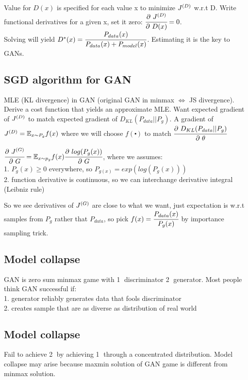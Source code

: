 \documentclass[12pt,a4paper]{article}
\begin{document}
Value for $D(x)$ is specified for each value x to minimize $J^{(D)}$ w.r.t D.
Write functional derivatives for a given x, set it zero: 
$\cfrac{\partial\ J^{(D)}}{\partial\ D(x)}=0$. \\
Solving will yield $D^*(x)=\cfrac{P_{data}(x)}{P_{data}(x)+P_{model}(x)}$. Estimating it is the key to GANs. 


\subsection{SGD algorithm for GAN}
MLE (KL divergence) in GAN (original GAN in minmax $\Leftrightarrow$ JS divergence). 
Derive a cost function that yields an approximate MLE. Want expected gradient of $J^{(D)}$ to match expected gradient of $D_{KL}(P_{data}||P_g)$. A gradient of $J^{(D)}=\mathbb{E}_{x\sim P_g} f(x)$ where we will choose $f(\centerdot)$ to match $\cfrac{\partial\ D_{KL}(P_{data}||P_g)}{\partial\ \theta}$ 

$\cfrac{\partial\ J^{(G)}}{\partial\ G}=\mathbb{E}_{x\sim p_g}f(x)\cfrac{\partial\ log(P_g(x))}{\partial\ G}$, where we assumes:\\
1. $P_g(x)\geq 0$ everywhere, so $P_{g(x)}=exp(log(P_g(x)))$\\
2. function derivative is continuous, so we can interchange derivative integral (Leibniz rule)

So we see derivatives of $J^{(G)}$ are close to what we want, just expectation is w.r.t samples from $P_g$ rather that $P_{data}$, so pick $f(x)=\cfrac{P_{data}(x)}{P_g(x)}$ by importance sampling trick.


\subsection{Model collapse}
GAN is zero sum minmax game with \textcircled{1} discriminator \textcircled{2} generator. Most people think GAN successful if:\\
1. generator reliably generates data that fools discriminator\\
2. creates sample that are as diverse as distribution of real world

\subsection{Model collapse}

Fail to achieve \textcircled{2} by achieving \textcircled{1} through a concentrated distribution. Model collapse may arise because maxmin solution of GAN game is different from minmax solution. 
\end{document}
